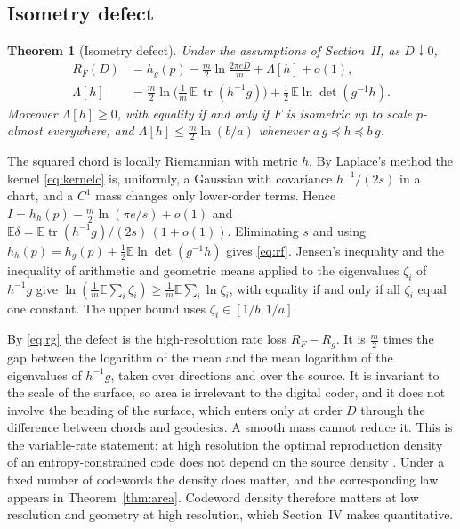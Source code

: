 \documentclass[journal]{IEEEtran}
\newtheorem{theorem}{Theorem}
\newcommand{\E}{\mathbb E}
\DeclareMathOperator{\tr}{tr}
\begin{document}
\subsection{Isometry defect}
\begin{theorem}[Isometry defect]\label{thm:defect}
Under the assumptions of Section~II, as $D\downarrow0$,
\begin{align}
 R_F(D)&=h_g(p)-\frac m2\ln\frac{2\pi eD}{m}+\Lambda[h]+o(1),\label{eq:rf}\\
 \Lambda[h]&=\frac m2\ln\Big(\frac1m\,\E\,\tr(h^{-1}g)\Big)+\frac12\,\E\ln\det(g^{-1}h).\label{eq:defect}
\end{align}
Moreover $\Lambda[h]\ge0$, with equality if and only if $F$ is isometric up to scale $p$-almost everywhere, and $\Lambda[h]\le\frac m2\ln(b/a)$ whenever $a\,g\preceq h\preceq b\,g$.
\end{theorem}
\begin{IEEEproof}
The squared chord is locally Riemannian with metric $h$. By Laplace's method the kernel \eqref{eq:kernelc} is, uniformly, a Gaussian with covariance $h^{-1}/(2s)$ in a chart, and a $C^1$ mass changes only lower-order terms. Hence $I=h_h(p)-\frac m2\ln(\pi e/s)+o(1)$ and $\E\delta=\E\tr(h^{-1}g)/(2s)\,(1+o(1))$. Eliminating $s$ and using $h_h(p)=h_g(p)+\frac12\E\ln\det(g^{-1}h)$ gives \eqref{eq:rf}. Jensen's inequality and the inequality of arithmetic and geometric means applied to the eigenvalues $\zeta_i$ of $h^{-1}g$ give $\ln(\frac1m\E\sum_i\zeta_i)\ge\frac1m\E\sum_i\ln\zeta_i$, with equality if and only if all $\zeta_i$ equal one constant. The upper bound uses $\zeta_i\in[1/b,1/a]$.
\end{IEEEproof}
By \eqref{eq:rg} the defect is the high-resolution rate loss $R_F-R_g$. It is $\frac m2$ times the gap between the logarithm of the mean and the mean logarithm of the eigenvalues of $h^{-1}g$, taken over directions and over the source. It is invariant to the scale of the surface, so area is irrelevant to the digital coder, and it does not involve the bending of the surface, which enters only at order $D$ through the difference between chords and geodesics. A smooth mass cannot reduce it. This is the variable-rate statement: at high resolution the optimal reproduction density of an entropy-constrained code does not depend on the source density \cite{linder1999high}. Under a fixed number of codewords the density does matter, and the corresponding law appears in Theorem~\ref{thm:area}. Codeword density therefore matters at low resolution and geometry at high resolution, which Section~IV makes quantitative.
\end{document}
